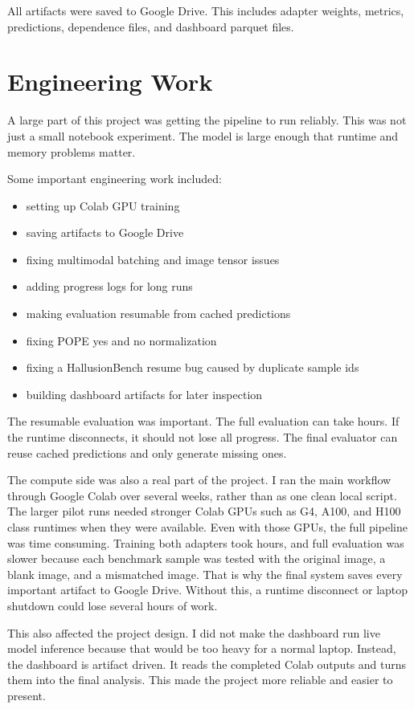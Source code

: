 \documentclass{article}
\begin{document}
All artifacts were saved to Google Drive.
This includes adapter weights, metrics, predictions, dependence files, and dashboard parquet files.

\section{Engineering Work}
A large part of this project was getting the pipeline to run reliably.
This was not just a small notebook experiment.
The model is large enough that runtime and memory problems matter.

Some important engineering work included:

\begin{itemize}
    \item setting up Colab GPU training
    \item saving artifacts to Google Drive
    \item fixing multimodal batching and image tensor issues
    \item adding progress logs for long runs
    \item making evaluation resumable from cached predictions
    \item fixing POPE yes and no normalization
    \item fixing a HallusionBench resume bug caused by duplicate sample ids
    \item building dashboard artifacts for later inspection
\end{itemize}

The resumable evaluation was important.
The full evaluation can take hours.
If the runtime disconnects, it should not lose all progress.
The final evaluator can reuse cached predictions and only generate missing ones.

The compute side was also a real part of the project.
I ran the main workflow through Google Colab over several weeks, rather than as one clean local script.
The larger pilot runs needed stronger Colab GPUs such as G4, A100, and H100 class runtimes when they were available.
Even with those GPUs, the full pipeline was time consuming.
Training both adapters took hours, and full evaluation was slower because each benchmark sample was tested with the original image, a blank image, and a mismatched image.
That is why the final system saves every important artifact to Google Drive.
Without this, a runtime disconnect or laptop shutdown could lose several hours of work.

This also affected the project design.
I did not make the dashboard run live model inference because that would be too heavy for a normal laptop.
Instead, the dashboard is artifact driven.
It reads the completed Colab outputs and turns them into the final analysis.
This made the project more reliable and easier to present.
\end{document}
